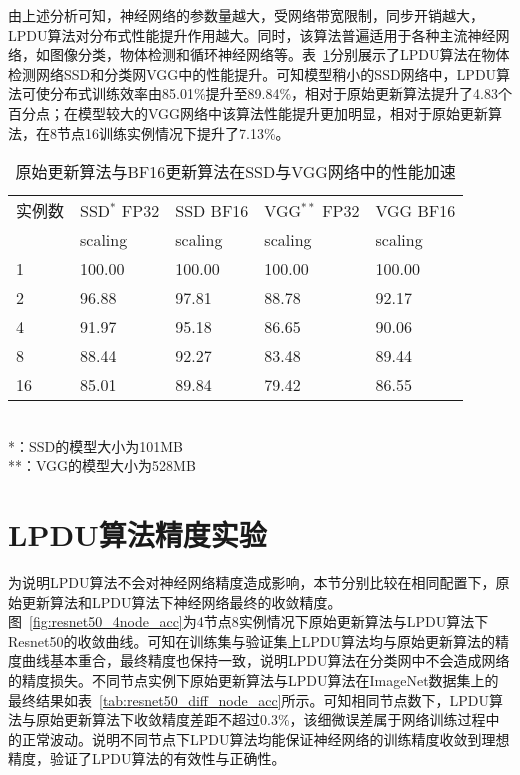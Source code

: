 由上述分析可知，神经网络的参数量越大，受网络带宽限制，同步开销越大，LPDU算法对分布式性能提升作用越大。同时，该算法普遍适用于各种主流神经网络，如图像分类，物体检测和循环神经网络等。表~\ref{tab:ssd_vgg_scaling}分别展示了LPDU算法在物体检测网络SSD和分类网VGG中的性能提升。可知模型稍小的SSD网络中，LPDU算法可使分布式训练效率由85.01\%提升至89.84\%，相对于原始更新算法提升了4.83个百分点；在模型较大的VGG网络中该算法性能提升更加明显，相对于原始更新算法，在8节点16训练实例情况下提升了7.13\%。
\begin{table}[htbp]
  \centering
  \caption{原始更新算法与BF16更新算法在SSD与VGG网络中的性能加速}
  \label{tab:ssd_vgg_scaling}
  \begin{minipage}[t]{0.8\textwidth} 
    \begin{tabularx}{\linewidth}{|l|X|X|X|X|}
      \hline
      实例数 & SSD$^{*}$ FP32 & SSD BF16 & VGG$^{**}$ FP32 & VGG BF16 \\
       & scaling & scaling & scaling & scaling\\
      \hline
1 & 100.00 & 100.00 & 100.00 & 100.00 \\
2 & 96.88 & 97.81 & 88.78 & 92.17 \\
4 & 91.97 & 95.18 & 86.65 & 90.06 \\
8 & 88.44 & 92.27 & 83.48 & 89.44 \\
16 & 85.01 & 89.84 & 79.42 & 86.55 \\
      \hline
    \end{tabularx}\\[2pt]
    \footnotesize
    *：SSD的模型大小为101MB\\
    **：VGG的模型大小为528MB
  \end{minipage}
\end{table}

\section{LPDU算法精度实验}

为说明LPDU算法不会对神经网络精度造成影响，本节分别比较在相同配置下，原始更新算法和LPDU算法下神经网络最终的收敛精度。图~\ref{fig:resnet50_4node_acc}为4节点8实例情况下原始更新算法与LPDU算法下Resnet50的收敛曲线。可知在训练集与验证集上LPDU算法均与原始更新算法的精度曲线基本重合，最终精度也保持一致，说明LPDU算法在分类网中不会造成网络的精度损失。不同节点实例下原始更新算法与LPDU算法在ImageNet数据集上的最终结果如表~\ref{tab:resnet50_diff_node_acc}所示。可知相同节点数下，LPDU算法与原始更新算法下收敛精度差距不超过0.3\%，该细微误差属于网络训练过程中的正常波动。说明不同节点下LPDU算法均能保证神经网络的训练精度收敛到理想精度，验证了LPDU算法的有效性与正确性。

